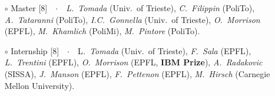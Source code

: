 \documentclass[
  usegeometry%
]{scrartcl}
\begin{document}
\begin{cv}{}
{\begin{itemize}
    \item[$\circ$] {\color{PineGreen}Master} [8]\ \ $\cdotp$\ \  \textit{L.\ Tomada} (Univ.\ of Trieste), \textit{C.\ Filippin} (PoliTo), \textit{A.\ Tataranni} (PoliTo), \textit{I.C.\ Gonnella} (Univ.\ of Trieste), \textit{O.\ Morrison} (EPFL), \textit{M.\ Khamlich} (PoliMi), \textit{M.\ Pintore} (PoliTo).
    \item[$\circ$] {\color{NavyBlue}Internship} [8]\ \ $\cdotp$\ \  L\textit{.\ Tomada} (Univ.\ of Trieste), \textit{F.\ Sala} (EPFL), \textit{L.\ Trentini} (EPFL), \textit{O.\ Morrison} (EPFL, \textbf{IBM Prize}), \textit{A.\ Radakovic} (SISSA), \textit{J.\ Manson} (EPFL), \textit{F.\ Pettenon} (EPFL), \textit{M.\ Hirsch} (Carnegie Mellon University).
\end{itemize}}
\vspace{-0.5em}


\end{cv}
\end{document}
